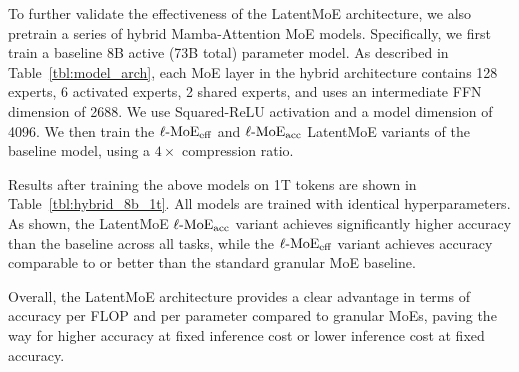 \begin{table}[ht!]
    \centering
    \caption{Accuracy comparisons of the 95BT-8BA model with and without LatentMoE. Compared to the baseline, with equivalent parameters, $\lmoeacc$ provides higher accuracy across all downstream tasks, while $\lmoeeff$ provides comparable to or better accuracy with much fewer FLOPs.}
    \label{tbl:8b_acc}
\end{table}


To further validate the effectiveness of the LatentMoE architecture, we also pretrain a series of hybrid Mamba-Attention MoE models. Specifically, we first train a baseline 8B active (73B total) parameter model. As described in Table~\ref{tbl:model_arch}, each MoE layer in the hybrid architecture contains 128 experts, 6 activated experts, 2 shared experts, and uses an intermediate FFN dimension of 2688. We use Squared-ReLU activation and a model dimension of 4096. We then train the $\lmoeeff$ and $\lmoeacc$ LatentMoE variants of the baseline model, using a $4\times$ compression ratio.

Results after training the above models on 1T tokens are shown in Table~\ref{tbl:hybrid_8b_1t}. All models are trained with identical hyperparameters. As shown, the LatentMoE $\lmoeacc$ variant achieves significantly higher accuracy than the baseline across all tasks, while the $\lmoeeff$  variant achieves accuracy comparable to or better than the standard granular MoE baseline. 

Overall, the LatentMoE architecture provides a clear advantage in terms of accuracy per FLOP and per parameter compared to granular MoEs, paving the way for higher accuracy at fixed inference cost or lower inference cost at fixed accuracy.

